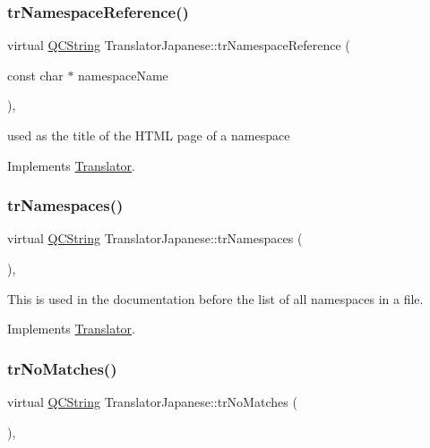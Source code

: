 \subsubsection{\texorpdfstring{trNamespaceReference()}{trNamespaceReference()}}
{\footnotesize\ttfamily virtual \mbox{\hyperlink{class_q_c_string}{Q\+C\+String}} Translator\+Japanese\+::tr\+Namespace\+Reference (\begin{DoxyParamCaption}\item[{const char $\ast$}]{namespace\+Name }\end{DoxyParamCaption})\hspace{0.3cm}{\ttfamily [inline]}, {\ttfamily [virtual]}}

used as the title of the H\+T\+ML page of a namespace 

Implements \mbox{\hyperlink{class_translator}{Translator}}.

\mbox{\label{class_translator_japanese_a16500bded4b5f2ac97867d30c45cba56}} 
\subsubsection{\texorpdfstring{trNamespaces()}{trNamespaces()}}
{\footnotesize\ttfamily virtual \mbox{\hyperlink{class_q_c_string}{Q\+C\+String}} Translator\+Japanese\+::tr\+Namespaces (\begin{DoxyParamCaption}{ }\end{DoxyParamCaption})\hspace{0.3cm}{\ttfamily [inline]}, {\ttfamily [virtual]}}

This is used in the documentation before the list of all namespaces in a file. 

Implements \mbox{\hyperlink{class_translator}{Translator}}.

\mbox{\label{class_translator_japanese_a67dcb66cf4ac9376069a6064100b3e0e}} 
\subsubsection{\texorpdfstring{trNoMatches()}{trNoMatches()}}
{\footnotesize\ttfamily virtual \mbox{\hyperlink{class_q_c_string}{Q\+C\+String}} Translator\+Japanese\+::tr\+No\+Matches (\begin{DoxyParamCaption}{ }\end{DoxyParamCaption})\hspace{0.3cm}{\ttfamily [inline]}, {\ttfamily [virtual]}}

